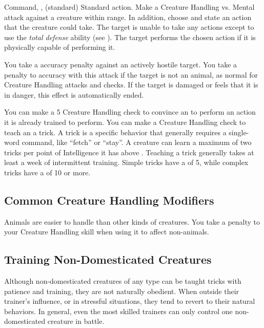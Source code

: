         \begin{sustainability}{Command}{, ,  (standard)}
            \label{Command}
            \abilityusagetime Standard action.
            \rankline
            Make a Creature Handling vs. Mental attack against a creature within \rngmed range.
            In addition, choose and state an action that the creature could take.
            \hit The target is unable to take any actions except to use the \textit{total defense} ability (see ).
            \crit The target performs the chosen action if it is physically capable of performing it.
            
            You take a  accuracy penalty against an actively hostile target.
            You take a  penalty to accuracy with this attack if the target is not an animal, as normal for Creature Handling attacks and checks.
            If the target is damaged or feels that it is in danger, this effect is automatically ended.
        \end{sustainability}
         You can make a  5 Creature Handling check to convince an  to perform an action it is already trained to perform.
         You can make a Creature Handling check to teach an  a trick.
        A trick is a specific behavior that generally requires a single-word command, like ``fetch'' or ``stay''.
        A creature can learn a maximum of two tricks per point of Intelligence it has above .
        Teaching a trick generally takes at least a week of intermittent training.
        Simple tricks have a  of 5, while complex tricks have a  of 10 or more.

    \subsection{Common Creature Handling Modifiers}
        Animals are easier to handle than other kinds of creatures.
        You take a  penalty to your Creature Handling skill when using it to affect non-animals.

    \subsection{Training Non-Domesticated Creatures}
        Although non-domesticated creatures of any type can be taught tricks with patience and training, they are not naturally obedient.
        When outside their trainer's influence, or in stressful situations, they tend to revert to their natural behaviors.
        In general, even the most skilled trainers can only control one non-domesticated creature in battle.

